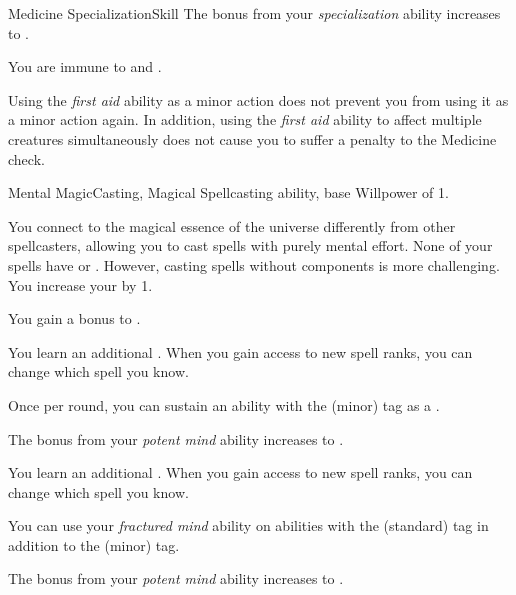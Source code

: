 \begin{feat}{Medicine Specialization}{Skill}
         The bonus from your \textit{specialization} ability increases to .

         You are immune to  and .

         Using the \textit{first aid} ability as a minor action does not prevent you from using it as a minor action again.
        In addition, using the \textit{first aid} ability to affect multiple creatures simultaneously does not cause you to suffer a penalty to the Medicine check.
    \end{feat}

    \begin{feat}{Mental Magic}{Casting, Magical}
        \featpre Spellcasting ability, base Willpower of 1.

         You connect to the magical essence of the universe differently from other spellcasters, allowing you to cast spells with purely mental effort.
        None of your spells have  or .
        However, casting spells without components is more challenging.
        You increase your  by 1.

         You gain a  bonus to  .

         You learn an additional .
        When you gain access to new spell ranks, you can change which spell you know.

         Once per round, you can sustain an ability with the  (minor) tag as a .

         The bonus from your \textit{potent mind} ability increases to .

         You learn an additional .
        When you gain access to new spell ranks, you can change which spell you know.

         You can use your \textit{fractured mind} ability on abilities with the  (standard) tag in addition to the  (minor) tag.

         The bonus from your \textit{potent mind} ability increases to .
    \end{feat}

